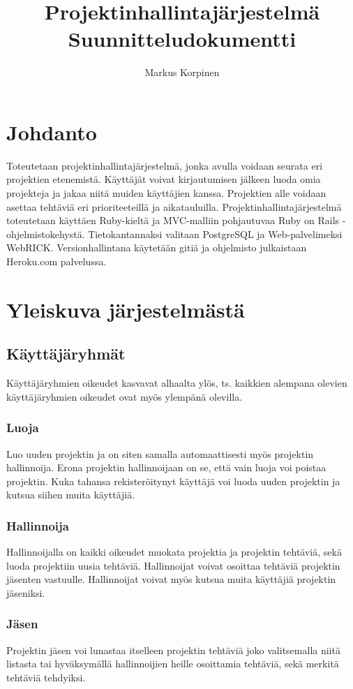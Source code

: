 \documentclass[12pt,a4paper]{article}
\title{Projektinhallintajärjestelmä\\Suunnitteludokumentti}
\author{Markus Korpinen}
\begin{document}
\maketitle
\section*{Johdanto}
Toteutetaan projektinhallintajärjestelmä, jonka avulla voidaan seurata eri projektien etenemistä. Käyttäjät voivat kirjautumisen jälkeen luoda omia projekteja ja jakaa niitä muiden käyttäjien kanssa. Projektien alle voidaan asettaa  tehtäviä eri prioriteeteillä ja aikatauluilla. Projektinhallintajärjestelmä toteutetaan käyttäen Ruby-kieltä ja MVC-malliin pohjautuvaa Ruby on Rails -ohjelmistokehystä. Tietokantannaksi valitaan PostgreSQL ja Web-palvelimeksi WebRICK. Versionhallintana käytetään gitiä ja ohjelmisto julkaistaan Heroku.com palvelussa.

\section*{Yleiskuva järjestelmästä}
\subsection*{Käyttäjäryhmät}
Käyttäjäryhmien oikeudet kasvavat alhaalta ylös, ts. kaikkien alempana olevien käyttäjäryhmien
oikeudet ovat myös ylempänä olevilla.
\subsubsection*{Luoja}
Luo uuden projektin ja on siten samalla automaattisesti myös projektin hallinnoija. Erona projektin
hallinnoijaan on se, että vain luoja voi poistaa projektin. Kuka tahansa rekisteröitynyt käyttäjä voi luoda
uuden projektin ja kutsua siihen muita käyttäjiä.
\subsubsection*{Hallinnoija}
Hallinnoijalla on kaikki oikeudet muokata projektia ja projektin tehtäviä, sekä luoda projektiin uusia
tehtäviä. Hallinnoijat voivat osoittaa tehtäviä projektin jäsenten vastuulle. Hallinnoijat voivat myös
kutsua muita käyttäjiä projektin jäseniksi.
\subsubsection*{Jäsen}
Projektin jäsen voi lunastaa itselleen projektin tehtäviä joko valitsemalla niitä listasta tai
hyväksymällä hallinnoijien heille osoittamia tehtäviä, sekä merkitä tehtäviä tehdyiksi.
\end{document}
